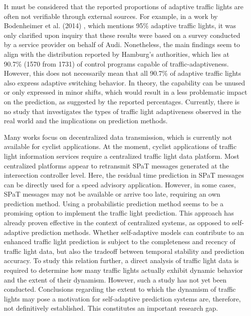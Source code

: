 It must be considered that the reported proportions of adaptive traffic lights are often not verifiable through external sources. For example, in a work by Bodenheimer et al. (2014) \cite{bodenheimer_enabling_2014}, which mentions 95\% adaptive traffic lights, it was only clarified upon inquiry that these results were based on a survey conducted by a service provider on behalf of Audi. Nonetheless, the main findings seem to align with the distribution reported by Hamburg's authorities, which lies at 90.7\% (1570 from 1731) of control programs capable of traffic-adaptiveness. However, this does not necessarily mean that all 90.7\% of adaptive traffic lights also express adaptive switching behavior. In theory, the capability can be unused or only expressed in minor shifts, which would result in a less problematic impact on the prediction, as suggested by the reported percentages. Currently, there is no study that investigates the types of traffic light adaptiveness observed in the real world and the implications on prediction methods.

\begin{Summary}
Many works focus on decentralized data transmission, which is currently not available for cyclist applications. At the moment, cyclist applications of traffic light information services require a centralized traffic light data platform. Most centralized platforms appear to retransmit SPaT messages generated at the intersection controller level. Here, the residual time prediction in SPaT messages can be directly used for a speed advisory application. However, in some cases, SPaT messages may not be available or arrive too late, requiring an own prediction method. Using a probabilistic prediction method seems to be a promising option to implement the traffic light prediction. This approach has already proven effective in the context of centralized systems, as opposed to self-adaptive prediction methods. Whether self-adaptive models can contribute to an enhanced traffic light prediction is subject to the completeness and recency of traffic light data, but also the tradeoff between temporal stability and prediction accuracy. To study this relation further, a direct analysis of traffic light data is required to determine how many traffic lights actually exhibit dynamic behavior and the extent of their dynamism. However, such a study has not yet been conducted. Conclusions regarding the extent to which the dynamism of traffic lights may pose a motivation for self-adaptive prediction systems are, therefore, not definitively established. This constitutes an important research gap.
\end{Summary}

